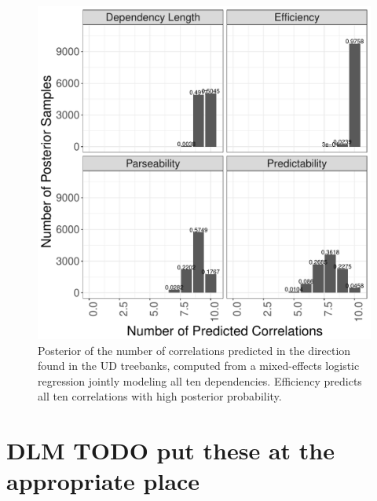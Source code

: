 \documentclass[9pt,twocolumn,twoside,lineno]{pnas-new}
\begin{document}
\begin{figure}
    \centering
     \includegraphics[scale=.45]{../results/correlations/figures/posterior-satisfied-universals-together.pdf}

	\caption{Posterior of the number of correlations predicted in the direction found in the UD treebanks, computed from a mixed-effects logistic regression jointly modeling all ten dependencies. Efficiency predicts all ten correlations with high posterior probability.}
    \label{fig:posterior-satisfied-count}
\end{figure}





\section{DLM TODO put these at the appropriate place}
\end{document}
